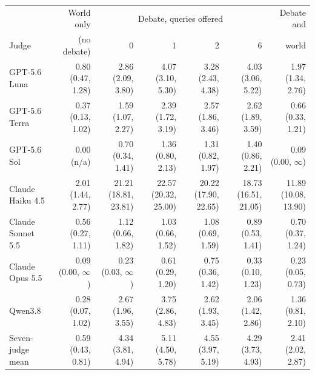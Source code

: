 \begin{tabular}{lrrrrrr}
\toprule
 & World only & \multicolumn{4}{c}{Debate, queries offered} & Debate and \\
Judge & (no debate) & 0 & 1 & 2 & 6 & world \\
\midrule
GPT-5.6 Luna & 0.80 (0.47, 1.28) & 2.86 (2.09, 3.80) & 4.07 (3.10, 5.30) & 3.28 (2.43, 4.38) & 4.03 (3.06, 5.22) & 1.97 (1.34, 2.76) \\
GPT-5.6 Terra & 0.37 (0.13, 1.02) & 1.59 (1.07, 2.27) & 2.39 (1.72, 3.19) & 2.57 (1.86, 3.46) & 2.62 (1.89, 3.59) & 0.66 (0.33, 1.21) \\
GPT-5.6 Sol & 0.00 (n/a) & 0.70 (0.34, 1.41) & 1.36 (0.80, 2.13) & 1.31 (0.82, 1.97) & 1.40 (0.86, 2.21) & 0.09 (0.00, $\infty$) \\
Claude Haiku 4.5 & 2.01 (1.44, 2.77) & 21.21 (18.81, 23.81) & 22.57 (20.32, 25.00) & 20.22 (17.90, 22.65) & 18.73 (16.51, 21.05) & 11.89 (10.08, 13.90) \\
Claude Sonnet 5.5 & 0.56 (0.27, 1.11) & 1.12 (0.66, 1.82) & 1.03 (0.66, 1.52) & 1.08 (0.69, 1.59) & 0.89 (0.53, 1.41) & 0.70 (0.37, 1.24) \\
Claude Opus 5.5 & 0.09 (0.00, $\infty$) & 0.23 (0.03, $\infty$) & 0.61 (0.29, 1.20) & 0.75 (0.36, 1.42) & 0.33 (0.10, 1.23) & 0.23 (0.05, 0.73) \\
Qwen3.8 & 0.28 (0.07, 1.02) & 2.67 (1.96, 3.55) & 3.75 (2.86, 4.83) & 2.62 (1.93, 3.45) & 2.06 (1.42, 2.86) & 1.36 (0.81, 2.10) \\
\midrule
Seven-judge mean & 0.59 (0.43, 0.81) & 4.34 (3.81, 4.94) & 5.11 (4.50, 5.78) & 4.55 (3.97, 5.19) & 4.29 (3.73, 4.93) & 2.41 (2.02, 2.87) \\
\bottomrule
\end{tabular}
